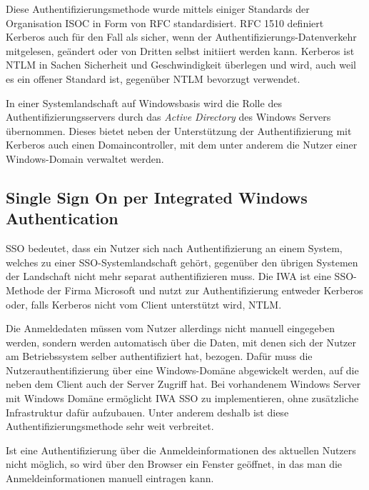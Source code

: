 
Diese Authentifizierungsmethode wurde mittels einiger Standards der Organisation \ac{ISOC} in Form von \ac{RFC} standardisiert.
\ac{RFC} 1510 \cite{Kohl.September1993} definiert Kerberos auch für den Fall als sicher, wenn der Authentifizierungs-Datenverkehr mitgelesen, geändert oder von Dritten selbst initiiert werden kann.
Kerberos ist \ac{NTLM} in Sachen Sicherheit und Geschwindigkeit überlegen und wird, auch weil es ein offener Standard ist, gegenüber \ac{NTLM} bevorzugt verwendet. \cite[S. 222]{Clercq.2004}

In einer Systemlandschaft auf Windowsbasis wird die Rolle des Authentifizierungsservers durch das \emph{Active Directory} des Windows Servers übernommen. \cite[S. 89]{Boer.2011} Dieses bietet neben der Unterstützung der Authentifizierung mit Kerberos auch einen Domaincontroller, mit dem unter anderem die Nutzer einer Windows-Domain verwaltet werden. \cite[S. 221-223]{Boddenberg.2014}

\subsection{Single Sign On per Integrated Windows Authentication}
\label{cha:WS_SSO_IWA}
\ac{SSO} bedeutet, dass ein Nutzer sich nach Authentifizierung an einem System, welches zu einer \ac{SSO}-Systemlandschaft gehört, gegenüber den übrigen Systemen der Landschaft nicht mehr separat authentifizieren muss. \cite[S. 69]{Graf.2008}
Die \ac{IWA} ist eine \ac{SSO}-Methode der Firma Microsoft \cite[S. 76]{Boer.2011} und nutzt zur Authentifizierung entweder Kerberos oder, falls Kerberos nicht vom Client unterstützt wird, \ac{NTLM}. \cite[S. 222]{Clercq.2004} 

Die Anmeldedaten müssen vom Nutzer allerdings nicht manuell eingegeben werden, sondern werden automatisch über die Daten, mit denen sich der Nutzer am Betriebssystem selber authentifiziert hat, bezogen. \cite[S. 41]{MicrosoftCorporation.2015} Dafür muss die Nutzerauthentifizierung über eine Windows-Domäne abgewickelt werden, auf die neben dem Client auch der Server Zugriff hat. \cite{MicrosoftCorporation.2003} Bei vorhandenem Windows Server mit Windows Domäne ermöglicht \ac{IWA} \ac{SSO} zu implementieren, ohne zusätzliche Infrastruktur dafür aufzubauen. Unter anderem deshalb ist diese Authentifizierungsmethode sehr weit verbreitet. \cite[S. 972]{Boddenberg.2014}

Ist eine Authentifizierung über die Anmeldeinformationen des aktuellen Nutzers nicht möglich, so wird über den Browser ein Fenster geöffnet, in das man die Anmeldeinformationen manuell eintragen kann. \cite[S. 223]{Clercq.2004}


